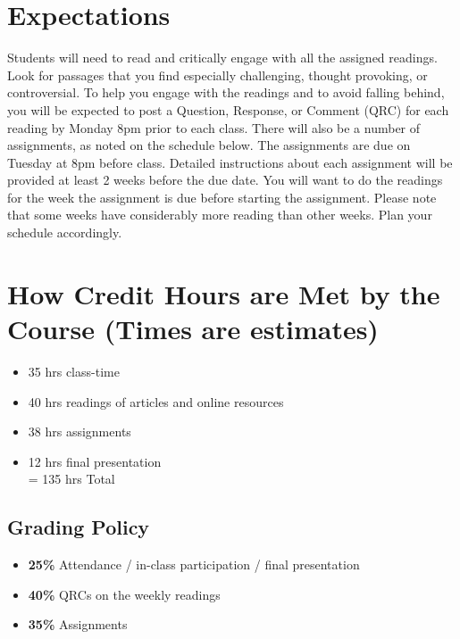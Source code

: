 \documentclass[11pt,man]{article}
\providecommand{\tightlist}{%
  \setlength{\itemsep}{0pt}\setlength{\parskip}{0pt}}
\begin{document}
\section{Expectations}\label{expectations}

Students will need to read and critically engage with all the assigned
readings. Look for passages that you find especially challenging,
thought provoking, or controversial. To help you engage with the
readings and to avoid falling behind, you will be expected to post a
Question, Response, or Comment (QRC) for each reading by Monday 8pm
prior to each class. There will also be a number of assignments, as
noted on the schedule below. The assignments are due on Tuesday at 8pm
before class. Detailed instructions about each assignment will be
provided at least 2 weeks before the due date. You will want to do the
readings for the week the assignment is due before starting the
assignment. Please note that some weeks have considerably more reading
than other weeks. Plan your schedule accordingly.

\section{How Credit Hours are Met by the Course (Times are
estimates)}\label{how-credit-hours-are-met-by-the-course-times-are-estimates}

\begin{itemize}
\tightlist
\item
  35 hrs class-time
\item
  40 hrs readings of articles and online resources
\item
  38 hrs assignments
\item
  12 hrs final presentation\\
  = 135 hrs Total
\end{itemize}

\subsection{Grading Policy}\label{grading-policy}

\begin{itemize}
\tightlist
\item
  \textbf{25\%} Attendance / in-class participation / final presentation
\item
  \textbf{40\%} QRCs on the weekly readings
\item
  \textbf{35\%} Assignments
\end{itemize}
\end{document}
